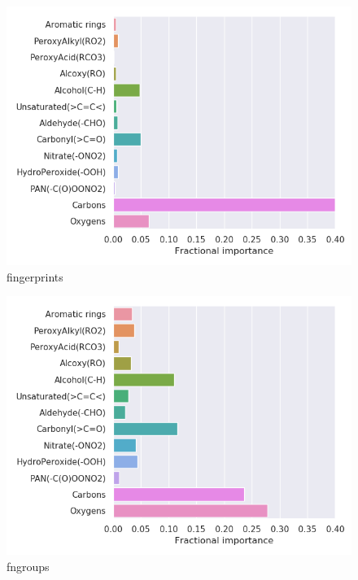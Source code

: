 \begin{subfigure}[b]{0.46\textwidth}
    \centering
    \includegraphics[width=\textwidth]{outputs/AE/fingerprints/legend.png}
    \caption{fingerprints}
    \label{fig:legend_AE_fingerprints}
\end{subfigure}
\begin{subfigure}[b]{0.46\textwidth}
    \centering
    \includegraphics[width=\textwidth]{outputs/AE/fngroups/legend.png}
    \caption{fngroups}
    \label{fig:legend_AE_fngroups}
\end{subfigure}\\

